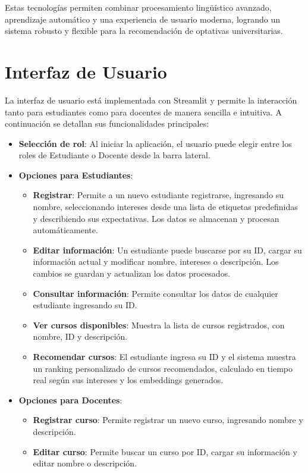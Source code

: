 \documentclass[12pt]{article}
\begin{document}
Estas tecnologías permiten combinar procesamiento lingüístico avanzado, aprendizaje automático y una experiencia de usuario moderna, logrando un sistema robusto y flexible para la recomendación de optativas universitarias.

\section{Interfaz de Usuario}
La interfaz de usuario está implementada con Streamlit y permite la interacción tanto para estudiantes como para docentes de manera sencilla e intuitiva. A continuación se detallan sus funcionalidades principales:

\begin{itemize}
    \item \textbf{Selección de rol}: Al iniciar la aplicación, el usuario puede elegir entre los roles de Estudiante o Docente desde la barra lateral.
    \item \textbf{Opciones para Estudiantes}:
    \begin{itemize}
        \item \textbf{Registrar}: Permite a un nuevo estudiante registrarse, ingresando su nombre, seleccionando intereses desde una lista de etiquetas predefinidas y describiendo sus expectativas. Los datos se almacenan y procesan automáticamente.
        \item \textbf{Editar información}: Un estudiante puede buscarse por su ID, cargar su información actual y modificar nombre, intereses o descripción. Los cambios se guardan y actualizan los datos procesados.
        \item \textbf{Consultar información}: Permite consultar los datos de cualquier estudiante ingresando su ID.
        \item \textbf{Ver cursos disponibles}: Muestra la lista de cursos registrados, con nombre, ID y descripción.
        \item \textbf{Recomendar cursos}: El estudiante ingresa su ID y el sistema muestra un ranking personalizado de cursos recomendados, calculado en tiempo real según sus intereses y los embeddings generados.
    \end{itemize}
    \item \textbf{Opciones para Docentes}:
    \begin{itemize}
        \item \textbf{Registrar curso}: Permite registrar un nuevo curso, ingresando nombre y descripción.
        \item \textbf{Editar curso}: Permite buscar un curso por ID, cargar su información y editar nombre o descripción.

\end{itemize}
\end{itemize}
\end{document}
